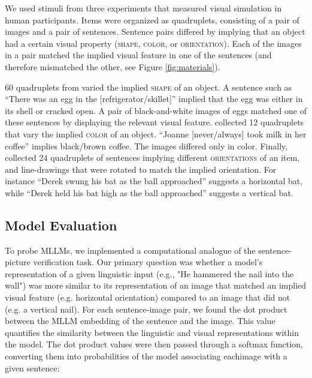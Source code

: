 \documentclass[10pt, a4paper]{article}
\begin{document}
We used stimuli from three experiments that measured visual simulation in human participants. Items were organized as quadruplets, consisting of a pair of images and a pair of sentences.
Sentence pairs differed by implying that an object had a certain visual property (\textsc{shape}, \textsc{color}, or \textsc{orientation}).
Each of the images in a pair matched the implied visual feature in one of the sentences (and therefore mismatched the other, see Figure \ref{fig:materials}).

60 quadruplets from \citet{pecher2009short} varied the implied \textsc{shape} of an object. A sentence such as ``There was an egg in the [refrigerator/skillet]'' implied that the egg was either in its shell or cracked open. A pair of black-and-white images of eggs matched one of these sentences by displaying the relevant visual feature.
\citet{connell2007representing} collected 12 quadruplets that vary the implied \textsc{color} of an object. ``Joanne [never/always] took milk in her coffee'' implies black/brown coffee. The images differed only in color.
Finally, \citet{stanfield2001effect} collected 24 quadruplets of sentences implying different \textsc{orientations} of an item, and line-drawings that were rotated to match the implied orientation. For instance ``Derek swung his bat as the ball approached'' suggests a horizontal bat, while ``Derek held his bat high as the ball approached'' suggests a vertical bat.


\subsection{Model Evaluation}

To probe MLLMs, we implemented a computational analogue of the sentence-picture verification task. Our primary question was whether a model's representation of a given linguistic input (e.g., "He hammered the nail into the wall") was more similar to its representation of an image that matched an implied visual feature (e.g. horizontal orientation) compared to an image that did not (e.g. a vertical nail).
For each sentence-image pair, we found the dot product between the MLLM embedding of the sentence and the image. This value quantifies the similarity between the linguistic and visual representations within the model. The dot product values were then passed through a softmax function, converting them into probabilities of the model associating eachimage with a given sentence:
\end{document}
